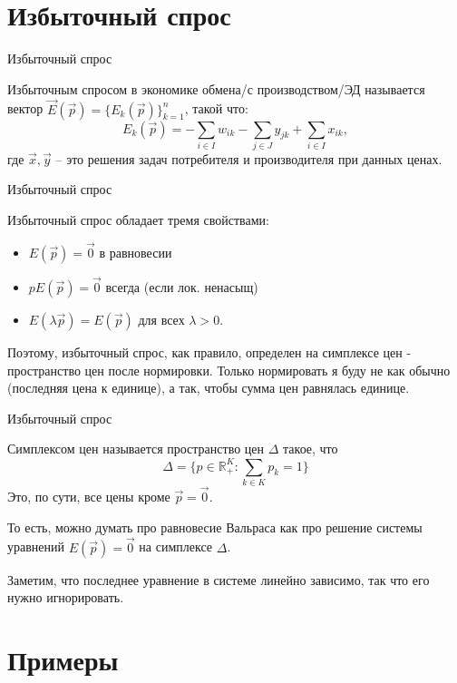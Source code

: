 \documentclass{beamer}
\begin{document}
\section{Избыточный спрос}

\begin{frame}{Избыточный спрос}

\alert{Избыточным спросом} в экономике обмена/с производством/ЭД называется вектор $\vec E(\vec p) = \{E_k(\vec p)\}_{k=1}^n$, такой что:
$$
E_k(\vec p) = - \sum_{i \in I} w_{ik} - \sum_{j \in J} y_{jk} + \sum_{i \in I} x_{ik},
$$
где $\vec x, \vec y$ – это решения задач потребителя и производителя при данных ценах.

\end{frame}

\begin{frame}{Избыточный спрос}

Избыточный спрос обладает тремя свойствами:

\begin{itemize}
  \item $E(\vec p) = \vec 0$ в равновесии
  \item $p E(\vec p) = \vec 0$ всегда (если лок. ненасыщ)
  \item $E(\lambda \vec p) = E(\vec p)$ для всех $\lambda > 0$.
\end{itemize}

Поэтому, избыточный спрос, как правило, определен на симплексе цен - пространство цен после нормировки. Только нормировать я буду не как обычно (последняя цена к единице), а так, чтобы сумма цен равнялась единице.

\end{frame}

\begin{frame}{Избыточный спрос}

\alert{Симплексом цен} называется пространство цен $\Delta$ такое, что 
$$\Delta = \{p \in \mathbb{R}^K_{+}: \sum_{k \in K} p_k = 1 \}$$ 
Это, по сути, все цены кроме $\vec p = \vec 0$.

То есть, можно думать про равновесие Вальраса как про решение системы уравнений $E(\vec p) = \vec 0$ на симплексе $\Delta$. 

Заметим, что последнее уравнение в системе линейно зависимо, так что его нужно игнорировать.

\end{frame}

\section{Примеры}
\end{document}
